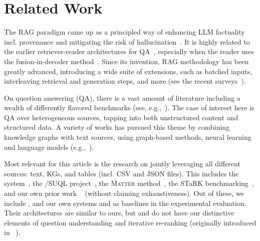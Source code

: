 \label{sec:background}
\section{Related Work}

The RAG paradigm came up as a principled way of enhancing LLM factuality incl. provenance and mitigating the risk of hallucination~\cite{Guu-REALM:ICML2020, DBLP:conf/nips/LewisPPPKGKLYR020}.
It is highly related to the earlier
retriever-reader architectures for QA~\cite{DBLP:conf/acl/ChenFWB17,DBLP:conf/emnlp/KarpukhinOMLWEC20}, especially when the reader uses the fusion-in-decoder method~\cite{DBLP:conf/eacl/IzacardG21,Oguz-UniK-QA:NAACL2022}.
Since its invention, RAG methodology has been greatly advanced, introducing a wide suite of extensions, such as batched inputs, interleaving retrieval and generation steps, and more (see the recent surveys~\cite{DBLP:journals/arXiv/abs-2312-10997,Zhao:arxiv2024}).

On question answering (QA), there is a vast amount of literature including a wealth of differently flavored benchmarks (see, e.g.,~\cite{RogersGA:CS2023}).
The case of interest here is QA over heterogeneous sources, tapping into both unstructured content and structured data. 
A variety of works has pursued this theme by combining knowledge graphs with text sources, using graph-based methods, neural learning and  language models (e.g.,~\cite{Pramanik-Uniqorn:JWS2024,Sun-PullNet:EMNLP2019,Yasunaga:NAACL2021}).

Most relevant for this article is the research on jointly leveraging all different sources: text, KGs, and tables (incl. CSV and JSON files). This includes  
the \unikqa system~\cite{Oguz-UniK-QA:NAACL2022},
the \spaghetti/SUQL project~\cite{Liu-SUQL:NAACL2024,Zhang-Spaghetti:ACL2024},
the \textsc{Matter} method~\cite{Lee-MATTER:ACL2024},
the STaRK benchmarking~\cite{Wu-STARK:arxiv2024},
and our own prior work
~\cite{Christmann-CONVINSE:SIGIR2022,Christmann-Explaignn:SIGIR2023} (without claiming exhaustiveness).
Out of these, we include \unikqa, \spaghetti and our own systems \convinse and \explaignn as baselines in the experimental evaluation.
Their architectures are similar to ours, but \unikqa and \spaghetti do not have our distinctive elements of
question understanding and iterative re-ranking (originally introduced in \explaignn~\cite{Christmann-Explaignn:SIGIR2023}).
